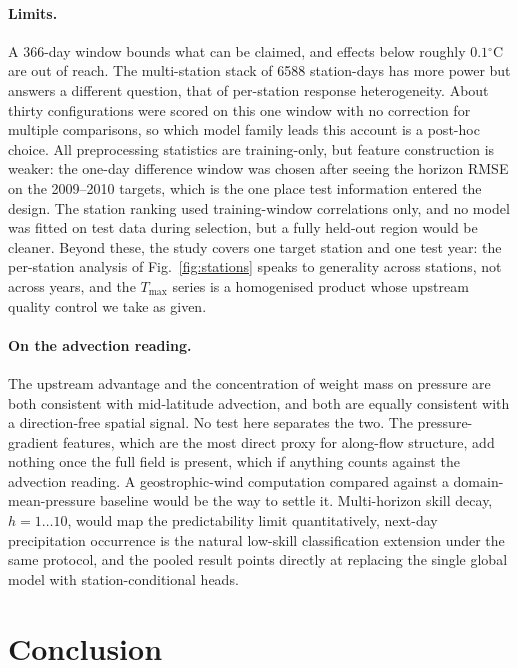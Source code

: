 \documentclass[11pt,a4paper]{article}
\newcommand{\tc}{\ensuremath{^{\circ}\mathrm{C}}}
\begin{document}
\paragraph{Limits.} A 366-day window bounds what can be claimed, and effects below roughly $0.1\tc$ are out of reach. The multi-station stack of 6588 station-days has more power but answers a different question, that of per-station response heterogeneity. About thirty configurations were scored on this one window with no correction for multiple comparisons, so which model family leads this account is a post-hoc choice. All preprocessing statistics are training-only, but feature construction is weaker: the one-day difference window was chosen after seeing the horizon RMSE on the 2009--2010 targets, which is the one place test information entered the design. The station ranking used training-window correlations only, and no model was fitted on test data during selection, but a fully held-out region would be cleaner. Beyond these, the study covers one target station and one test year: the per-station analysis of Fig.~\ref{fig:stations} speaks to generality across stations, not across years, and the $T_{\max}$ series is a homogenised product whose upstream quality control we take as given.

\paragraph{On the advection reading.} The upstream advantage and the concentration of weight mass on pressure are both consistent with mid-latitude advection, and both are equally consistent with a direction-free spatial signal. No test here separates the two. The pressure-gradient features, which are the most direct proxy for along-flow structure, add nothing once the full field is present, which if anything counts against the advection reading. A geostrophic-wind computation compared against a domain-mean-pressure baseline would be the way to settle it. Multi-horizon skill decay, $h = 1 \ldots 10$, would map the predictability limit quantitatively, next-day precipitation occurrence is the natural low-skill classification extension under the same protocol, and the pooled result points directly at replacing the single global model with station-conditional heads.

\section{Conclusion}
\label{sec:conclusion}
\end{document}
